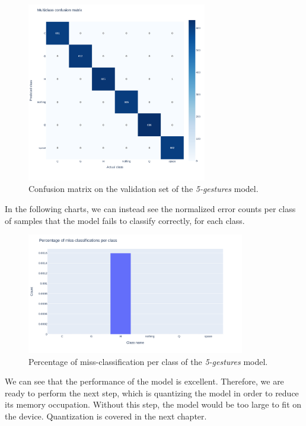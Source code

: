 \documentclass{Configuration_Files/PoliMi3i_thesis}
\begin{document}
\begin{figure}[H]
   \centering
   \includegraphics[width=0.7\textwidth]{Figures/5-gestures/5_cm.png}
   \caption{Confusion matrix on the validation set of the \textit{5-gestures} model.}
   \label{fig:5_cmatrix}
\end{figure}

In the following charts, we can instead see the normalized error counts per class of samples that the model fails to classify correctly, for each class.

\begin{figure}[H]
   \centering
   \includegraphics[width=0.85\textwidth]{Figures/5-gestures/5_errors.png}
   \caption{Percentage of miss-classification per class of the \textit{5-gestures} model.}
   \label{fig:5_errors}
\end{figure}

We can see that the performance of the model is excellent. Therefore, we are ready to perform the next step, which is quantizing the model in order to reduce its memory occupation. Without this step, the model would be too large to fit on the device. Quantization is covered in the next chapter.
\end{document}
